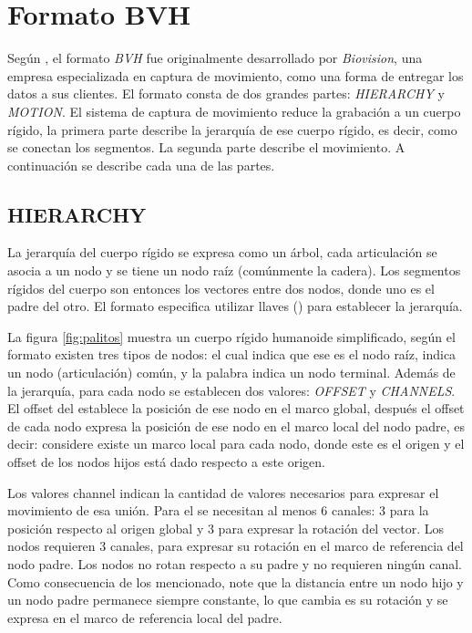\chapter{Formato BVH}\label{ap:bvh}

Según \cite{wisconsin-bvh}, el formato \emph{BVH} fue originalmente desarrollado por \emph{Biovision}, una empresa especializada en captura de movimiento, como una forma de entregar los datos a sus clientes. El formato consta de dos grandes partes: \emph{HIERARCHY} y \emph{MOTION}. El sistema de captura de movimiento reduce la grabación a un cuerpo rígido, la primera parte describe la jerarquía de ese cuerpo rígido, es decir, como se conectan los segmentos. La segunda parte describe el movimiento. A continuación se describe cada una de las partes.

\section{HIERARCHY}

La jerarquía del cuerpo rígido se expresa como un árbol, cada articulación se asocia a un nodo y se tiene un nodo raíz (comúnmente la cadera). Los segmentos rígidos del cuerpo son entonces los vectores entre dos nodos, donde uno es el padre del otro. El formato especifica utilizar llaves (\mono{\{\}}) para establecer la jerarquía. 

La figura \ref{fig:palitos} muestra un cuerpo rígido humanoide simplificado, según el formato existen tres tipos de nodos:  el cual indica que ese es el nodo raíz,  indica un nodo (articulación) común, y la palabra  indica un nodo terminal. Además de la jerarquía, para cada nodo se establecen dos valores: \emph{OFFSET} y \emph{CHANNELS}. El offset del  establece la posición de ese nodo en el marco global, después el offset de cada nodo expresa la posición de ese nodo en el marco local del nodo padre, es decir: considere existe un marco local para cada nodo, donde este es el origen y el offset de los nodos hijos está dado respecto a este origen. 

Los valores channel indican la cantidad de valores necesarios para expresar el movimiento de esa unión. Para el  se necesitan al menos 6 canales: 3 para la posición respecto al origen global y 3 para expresar la rotación del vector. Los nodos  requieren 3 canales, para expresar su rotación en el marco de referencia del nodo padre. Los nodos  no rotan respecto a su padre y no requieren ningún canal. Como consecuencia de los mencionado, note que la distancia entre un nodo hijo y un nodo padre permanece siempre constante, lo que cambia es su rotación y se expresa en el marco de referencia local del padre. 

